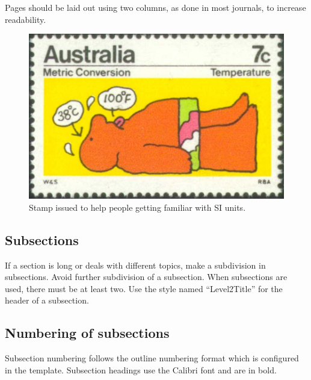 \documentclass[10pt]{style_src/imeko_acta}
\begin{document}
Pages should be laid out using two columns, as done in most journals, to increase readability.

\begin{figure}
	\centering
	\includegraphics[width=0.68\linewidth]{image1}
	\caption{Stamp issued to help people getting familiar with SI units.}
	\label{fig:image1}
\end{figure}

	

\subsection{Subsections} \label{sec:sub1}

If a section is long or deals with different topics, make a subdivision in subsections. Avoid further subdivision of a subsection. When subsections are used, there must be at least two. Use the style named ``Level2Title'' for the header of a subsection.

\subsection{Numbering of subsections}

Subsection numbering follows the outline numbering format which is configured in the template. Subsection headings use the Calibri font and are in bold.
\end{document}
